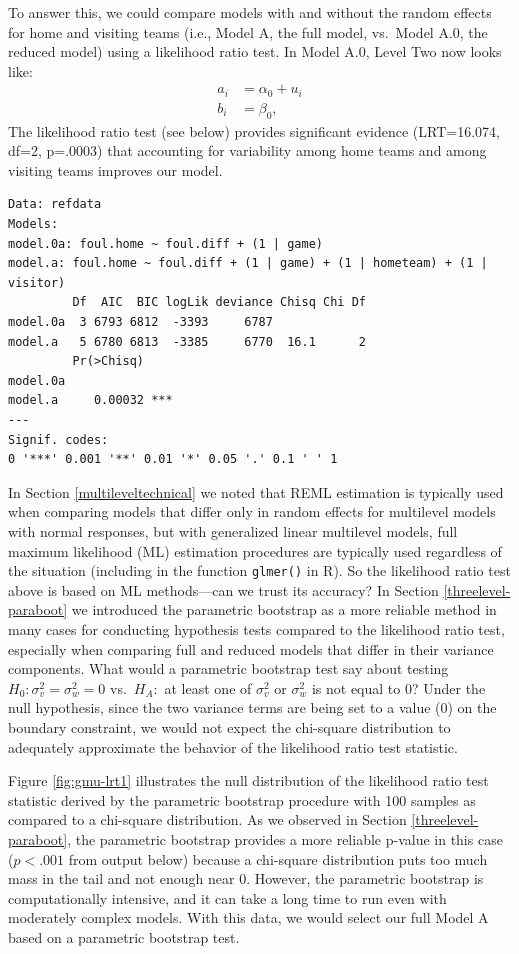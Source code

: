 \documentclass[
]{krantz}
\begin{document}
To answer this, we could compare models with and without the random effects for home and visiting teams (i.e., Model A, the full model, vs.~Model A.0, the reduced model) using a likelihood ratio test. In Model A.0, Level Two now looks like:
\begin{align*}
a_{i} & = \alpha_{0}+u_{i} \\
b_{i} & = \beta_{0},
\end{align*}
The likelihood ratio test (see below) provides significant evidence (LRT=16.074, df=2, p=.0003) that accounting for variability among home teams and among visiting teams improves our model.

\begin{verbatim}
Data: refdata
Models:
model.0a: foul.home ~ foul.diff + (1 | game)
model.a: foul.home ~ foul.diff + (1 | game) + (1 | hometeam) + (1 | visitor)
         Df  AIC  BIC logLik deviance Chisq Chi Df
model.0a  3 6793 6812  -3393     6787             
model.a   5 6780 6813  -3385     6770  16.1      2
         Pr(>Chisq)    
model.0a               
model.a     0.00032 ***
---
Signif. codes:  
0 '***' 0.001 '**' 0.01 '*' 0.05 '.' 0.1 ' ' 1
\end{verbatim}

In Section \ref{multileveltechnical} we noted that REML estimation is typically used when comparing models that differ only in random effects for multilevel models with normal responses, but with generalized linear multilevel models, full maximum likelihood (ML) estimation procedures are typically used regardless of the situation (including in the function \texttt{glmer()} in R). So the likelihood ratio test above is based on ML methods---can we trust its accuracy? In Section \ref{threelevel-paraboot} we introduced the parametric bootstrap as a more reliable method in many cases for conducting hypothesis tests compared to the likelihood ratio test, especially when comparing full and reduced models that differ in their variance components. What would a parametric bootstrap test say about testing \(H_{0}: \sigma_{v}^{2}=\sigma_{w}^{2}=0\) vs.~\(H_{A}:\) at least one of \(\sigma_{v}^{2}\) or \(\sigma_{w}^{2}\) is not equal to 0? Under the null hypothesis, since the two variance terms are being set to a value (0) on the boundary constraint, we would not expect the chi-square distribution to adequately approximate the behavior of the likelihood ratio test statistic.

Figure \ref{fig:gmu-lrt1} illustrates the null distribution of the likelihood ratio test statistic derived by the parametric bootstrap procedure with 100 samples as compared to a chi-square distribution. As we observed in Section \ref{threelevel-paraboot}, the parametric bootstrap provides a more reliable p-value in this case (\(p<.001\) from output below) because a chi-square distribution puts too much mass in the tail and not enough near 0. However, the parametric bootstrap is computationally intensive, and it can take a long time to run even with moderately complex models. With this data, we would select our full Model A based on a parametric bootstrap test.
\end{document}
